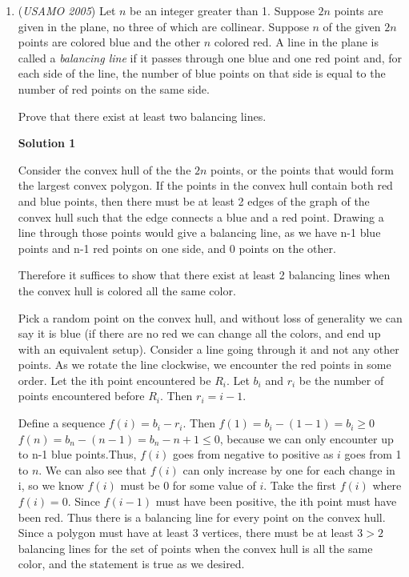 \begin{enumerate}
	\item (\textit{USAMO 2005}) Let $n$ be an integer greater than 1. Suppose $2n$ points are given in the plane, no three of which are collinear. Suppose $n$ of the given $2n$ points are colored blue and the other $n$ colored red. A line in the plane is called a \textit{balancing line} if it passes through one blue and one red point and, for each side of the line, the number of blue points on that side is equal to the number of red points on the same side.


 Prove that there exist at least two balancing lines.


 



\textbf{Solution 1}

Consider the convex hull of the the $2n$ points, or the points that would form the largest convex polygon. If the points in the convex hull contain both red and blue points, then there must be at least 2 edges of the graph of the convex hull such that the edge connects a blue and a red point. Drawing a line through those points would give a balancing line, as we have n-1 blue points and n-1 red points on one side, and 0 points on the other.

 Therefore it suffices to show that there exist at least 2 balancing lines when the convex hull is colored all the same color. 

 Pick a random point on the convex hull, and without loss of generality we can say it is blue (if there are no red we can change all the colors, and end up with an equivalent setup). Consider a line going through it and not any other points. As we rotate the line clockwise, we encounter the red points in some order. Let the ith point encountered be $R_i$. Let $b_i$ and $r_i$ be the number of points encountered before $R_i$. Then $r_i=i-1$.

 Define a sequence $f(i)=b_i-r_i$. Then $f(1)=b_i-(1-1)=b_i\geq0$$f(n)=b_n-(n-1)=b_n-n+1\leq0$, because we can only encounter up to n-1 blue points.Thus, $f(i)$ goes from negative to positive as $i$ goes from 1 to $n$. We can also see that $f(i)$ can only increase by one for each change in i, so we know $f(i)$ must be 0 for some value of $i$. Take the first $f(i)$ where $f(i) = 0$. Since $f(i-1)$ must have been positive, the ith point must have been red. Thus there is a balancing line for every point on the convex hull. Since a polygon must have at least 3 vertices, there must be at least $3>2$ balancing lines for the set of points when the convex hull is all the same color, and the statement is true as we desired.


\end{enumerate}
